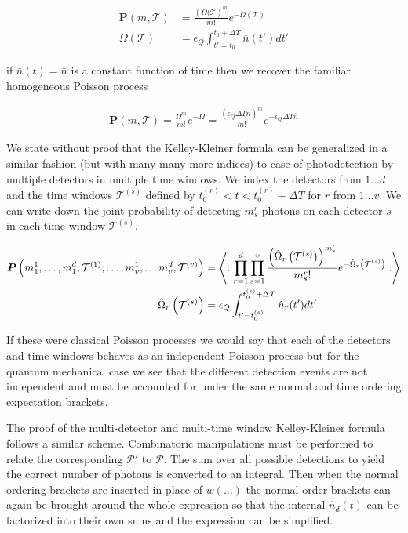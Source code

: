 \documentclass[12pt]{article}
\newcommand{\ep}{\epsilon}
\newcommand{\bv}[1]{\boldsymbol{#1}}
\begin{document}
\begin{align}
\bv{P}(m,\mathcal{T}) &= \frac{\left(\Omega(\mathcal{T}\right)^m}{m!} e^{-\Omega(\mathcal{T})}\\
\Omega(\mathcal{T}) &= \ep_Q \int_{t'=t_0}^{t_0+\Delta T} \bar{n}(t')dt'
\end{align}

if $\bar{n}(t) = \bar{n}$ is a constant function of time then we recover the familiar homogeneous Poisson process

\begin{align}
\bv{P}(m,\mathcal{T}) = \frac{\Omega^m}{m!}e^{-\Omega} = \frac{(\ep_Q \Delta T \bar{n})^m}{m!}e^{-\ep_Q \Delta T \bar{n}}
\end{align}

We state without proof that the Kelley-Kleiner formula can be generalized in a similar fashion (but with many many more indices) to case of photodetection by multiple detectors in multiple time windows. We index the detectors from $1 \ldots d$ and the time windows $\mathcal{T}^{(s)}$ defined by $t_0^{(r)} < t < t_0^{(r)}+\Delta T$ for $r$ from $1 \ldots v$. We can write down the joint probability of detecting $m_s^r$ photons on each detector $s$ in each time window $\mathcal{T}^{(s)}$.

\begin{align}
\bv{P}\left(m_1^1, \ldots, m_1^d, \mathcal{T}^{(1)}; \ldots ; m_v^1, \ldots m_v^d, \mathcal{T}^{(v)}\right) &= \Braket{:\prod_{r=1}^d \prod_{s=1}^v \frac{\left(\hat{\Omega}_r\left(\mathcal{T}^{(s)}\right) \right)^{m_s^r}}{m_s^r !} e^{-\hat{\Omega}_r\left(\mathcal{T}^{(s)}\right)}:}\\
\hat{\Omega}_r\left(\mathcal{T}^{(s)}\right) &= \ep_Q \int_{t' = t_0^{(s)}}^{t_0^{(s)} + \Delta T} \hat{n}_r(t') dt'
\end{align}

If these were classical Poisson processes we would say that each of the detectors and time windows behaves as an independent Poisson process but for the quantum mechanical case we see that the different detection events are not independent and must be accounted for under the same normal and time ordering expectation brackets.

The proof of the multi-detector and multi-time window Kelley-Kleiner formula follows a similar scheme. Combinatoric manipulations must be performed to relate the corresponding $\mathcal{P'}$ to $\mathcal{P}$. The sum over all possible detections to yield the correct number of photons is converted to an integral. Then when the normal ordering brackets are inserted in place of $w(\ldots)$ the normal order brackets can again be brought around the whole expression so that the internal $\hat{n}_d(t)$ can be factorized into their own sums and the expression can be simplified.
\end{document}
